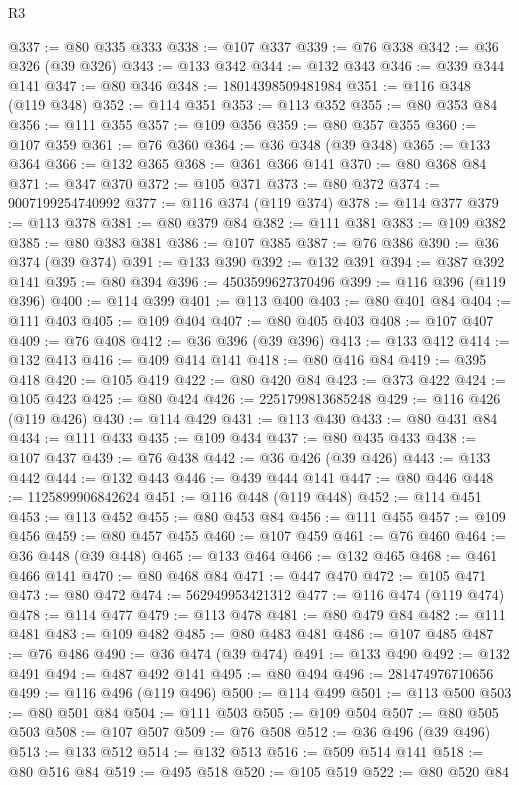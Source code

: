 \begin{lexlean}{R3}
\begin{coremodule}
@337 := @80 @335 @333
@338 := @107 @337
@339 := @76 @338
@342 := @36 @326 (@39 @326)
@343 := @133 @342
@344 := @132 @343
@346 := @339 @344 @141
@347 := @80 @346
@348 := 18014398509481984
@351 := @116 @348 (@119 @348)
@352 := @114 @351
@353 := @113 @352
@355 := @80 @353 @84
@356 := @111 @355
@357 := @109 @356
@359 := @80 @357 @355
@360 := @107 @359
@361 := @76 @360
@364 := @36 @348 (@39 @348)
@365 := @133 @364
@366 := @132 @365
@368 := @361 @366 @141
@370 := @80 @368 @84
@371 := @347 @370
@372 := @105 @371
@373 := @80 @372
@374 := 9007199254740992
@377 := @116 @374 (@119 @374)
@378 := @114 @377
@379 := @113 @378
@381 := @80 @379 @84
@382 := @111 @381
@383 := @109 @382
@385 := @80 @383 @381
@386 := @107 @385
@387 := @76 @386
@390 := @36 @374 (@39 @374)
@391 := @133 @390
@392 := @132 @391
@394 := @387 @392 @141
@395 := @80 @394
@396 := 4503599627370496
@399 := @116 @396 (@119 @396)
@400 := @114 @399
@401 := @113 @400
@403 := @80 @401 @84
@404 := @111 @403
@405 := @109 @404
@407 := @80 @405 @403
@408 := @107 @407
@409 := @76 @408
@412 := @36 @396 (@39 @396)
@413 := @133 @412
@414 := @132 @413
@416 := @409 @414 @141
@418 := @80 @416 @84
@419 := @395 @418
@420 := @105 @419
@422 := @80 @420 @84
@423 := @373 @422
@424 := @105 @423
@425 := @80 @424
@426 := 2251799813685248
@429 := @116 @426 (@119 @426)
@430 := @114 @429
@431 := @113 @430
@433 := @80 @431 @84
@434 := @111 @433
@435 := @109 @434
@437 := @80 @435 @433
@438 := @107 @437
@439 := @76 @438
@442 := @36 @426 (@39 @426)
@443 := @133 @442
@444 := @132 @443
@446 := @439 @444 @141
@447 := @80 @446
@448 := 1125899906842624
@451 := @116 @448 (@119 @448)
@452 := @114 @451
@453 := @113 @452
@455 := @80 @453 @84
@456 := @111 @455
@457 := @109 @456
@459 := @80 @457 @455
@460 := @107 @459
@461 := @76 @460
@464 := @36 @448 (@39 @448)
@465 := @133 @464
@466 := @132 @465
@468 := @461 @466 @141
@470 := @80 @468 @84
@471 := @447 @470
@472 := @105 @471
@473 := @80 @472
@474 := 562949953421312
@477 := @116 @474 (@119 @474)
@478 := @114 @477
@479 := @113 @478
@481 := @80 @479 @84
@482 := @111 @481
@483 := @109 @482
@485 := @80 @483 @481
@486 := @107 @485
@487 := @76 @486
@490 := @36 @474 (@39 @474)
@491 := @133 @490
@492 := @132 @491
@494 := @487 @492 @141
@495 := @80 @494
@496 := 281474976710656
@499 := @116 @496 (@119 @496)
@500 := @114 @499
@501 := @113 @500
@503 := @80 @501 @84
@504 := @111 @503
@505 := @109 @504
@507 := @80 @505 @503
@508 := @107 @507
@509 := @76 @508
@512 := @36 @496 (@39 @496)
@513 := @133 @512
@514 := @132 @513
@516 := @509 @514 @141
@518 := @80 @516 @84
@519 := @495 @518
@520 := @105 @519
@522 := @80 @520 @84

\end{coremodule}
\end{lexlean}
